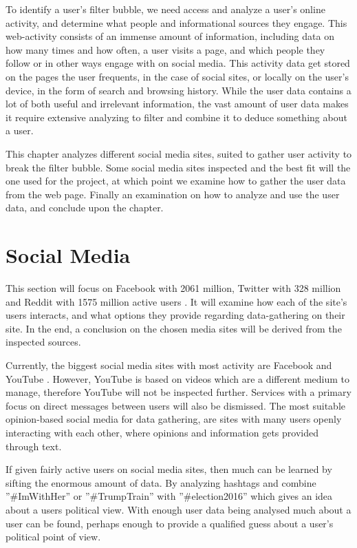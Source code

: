 
To identify a user's filter bubble, we need access and analyze a user's online
activity, and determine what people and informational sources they engage. This
web-activity consists of an immense amount of information, including data on how
many times and how often, a user visits a page, and which people they follow or
in other ways engage with on social media. This activity data get stored on the
pages the user frequents, in the case of social sites, or locally on the user's
device, in the form of search and browsing history. While the user data contains
a lot of both useful and irrelevant information, the vast amount of user data
makes it require extensive analyzing to filter and combine it to deduce
something about a user.\nl

This chapter analyzes different social media sites, suited to gather user
activity to break the filter bubble. Some social media sites inspected and the
best fit will the one used for the project, at which point we examine how to
gather the user data from the web page. Finally an examination on how to analyze
and use the user data, and conclude upon the chapter.


\section{Social Media}
This section will focus on Facebook with 2061 million, Twitter with 328 million
and Reddit with 1575 million active users \citep{SocialMediaStats,
AdvertiseOnReddit}.
It will examine how each of the site's users interacts, and what options they
provide regarding data-gathering on their site. In the end, a conclusion on the
chosen media sites will be derived from the inspected sources.

Currently, the biggest social media sites with most activity are Facebook and
YouTube \citep{SocialMediaStats}. However, YouTube is based on videos which are
a different medium to manage, therefore YouTube will not be inspected further.
Services with a primary focus on direct messages between users will also be
dismissed. The most suitable opinion-based social media for data gathering, are
sites with many users openly interacting with each other, where opinions and
information gets provided through text.\nl

If given fairly active users on social media sites, then much can be learned by
sifting the enormous amount of data. By analyzing hashtags and combine
”\#ImWithHer” or ”\#TrumpTrain” with ”\#election2016” which gives an idea about
a users political view. With enough user data being analysed much about a user
can be found, perhaps enough to provide a qualified guess about a user's
political point of view.\nl



